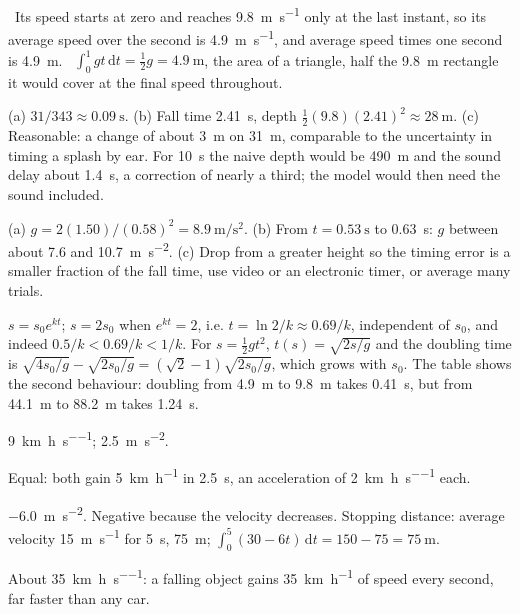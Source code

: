 \documentclass[11pt,twoside,openany]{book}
\newcommand{\dd}{\mathrm{d}}
\newcommand{\viewtag}[3]{\fcolorbox{#2}{#3}{\footnotesize\textbf{\textcolor{#2}{#1}}}}
\newcommand{\elemtag}{\viewtag{Elementary}{elemcol}{elempale}}
\newcommand{\calctag}{\viewtag{Calculus}{calccol}{calcpale}}
\begin{document}
\begin{description}[leftmargin=2.6em,itemsep=3pt,style=sameline]
  \item[2.36] \elemtag\ Its speed starts at zero and reaches \SI{9.8}{\metre\per\second} only at the last instant, so its average speed over the second is \SI{4.9}{\metre\per\second}, and average speed times one second is \SI{4.9}{\metre}. \calctag\ $\int_0^1 gt\,\dd t = \tfrac12 g = \SI{4.9}{\metre}$, the area of a triangle, half the \SI{9.8}{\metre} rectangle it would cover at the final speed throughout.
  \item[2.37] (a) $31/343 \approx \SI{0.09}{\second}$. (b) Fall time \SI{2.41}{\second}, depth $\tfrac12 (9.8)(2.41)^2 \approx \SI{28}{\metre}$. (c) Reasonable: a change of about \SI{3}{\metre} on \SI{31}{\metre}, comparable to the uncertainty in timing a splash by ear. For \SI{10}{\second} the naive depth would be \SI{490}{\metre} and the sound delay about \SI{1.4}{\second}, a correction of nearly a third; the model would then need the sound included.
  \item[2.38] (a) $g = 2(1.50)/(0.58)^2 = \SI{8.9}{\metre\per\second\squared}$. (b) From $t = \SI{0.53}{\second}$ to \SI{0.63}{\second}: $g$ between about \SI{7.6}{} and \SI{10.7}{\metre\per\second\squared}. (c) Drop from a greater height so the timing error is a smaller fraction of the fall time, use video or an electronic timer, or average many trials.
  \item[2.39] $s = s_0 e^{kt}$; $s = 2s_0$ when $e^{kt} = 2$, i.e. $t = \ln 2/k \approx 0.69/k$, independent of $s_0$, and indeed $0.5/k < 0.69/k < 1/k$. For $s = \tfrac12 g t^2$, $t(s) = \sqrt{2s/g}$ and the doubling time is $\sqrt{4s_0/g} - \sqrt{2s_0/g} = (\sqrt2 - 1)\sqrt{2s_0/g}$, which grows with $s_0$. The table shows the second behaviour: doubling from \SI{4.9}{\metre} to \SI{9.8}{\metre} takes \SI{0.41}{\second}, but from \SI{44.1}{\metre} to \SI{88.2}{\metre} takes \SI{1.24}{\second}.
  \item[2.40] \SI{9}{\kilo\metre\per\hour\per\second}; \SI{2.5}{\metre\per\second\squared}.
  \item[2.41] Equal: both gain \SI{5}{\kilo\metre\per\hour} in \SI{2.5}{\second}, an acceleration of \SI{2}{\kilo\metre\per\hour\per\second} each.
  \item[2.42] \SI{-6.0}{\metre\per\second\squared}. Negative because the velocity decreases. Stopping distance: average velocity \SI{15}{\metre\per\second} for \SI{5}{\second}, \SI{75}{\metre}; $\int_0^5 (30 - 6t)\,\dd t = 150 - 75 = \SI{75}{\metre}$.
  \item[2.43] About \SI{35}{\kilo\metre\per\hour\per\second}: a falling object gains \SI{35}{\kilo\metre\per\hour} of speed every second, far faster than any car.

\end{description}
\end{document}
